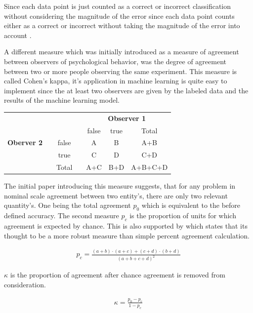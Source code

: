 \documentclass[
a4paper, 
12pt,
grayscalebody, %
abstract=on,
twoside, BCOR10mm, 12pt, DIV13,headinclude, footexclude, final, abstracton, openright
]{ibireprt}
\numberwithin{equation}{chapter}
\numberwithin{table}{chapter}
\numberwithin{figure}{chapter}
\numberwithin{algorithm}{chapter}
\numberwithin{example}{chapter}
\numberwithin{example}{chapter}
\begin{document}
Since each data point  is just counted as a correct or incorrect classification without considering the magnitude of the error since each data point counts either as a correct or incorrect without taking the magnitude of the error into account \cite{Dinga2019}.

A different measure which was initially introduced as a measure of agreement between observers of psychological behavior, was the degree of agreement between two or more people observing the same experiment. This measure is called Cohen's kappa, it's application in machine learning is quite easy to implement since the at least two observers are given by the labeled data and the results of the machine learning model.


\newcommand{\STAB}[1]{\begin{tabular}{@{}c@{}}#1\end{tabular}}
\begin{center}
	\begin{tabular}{ccccccc}
		\hline
		&&&&\multicolumn{3}{c}{\textbf{Observer 1}}\\
		&&&&false&true&Total\\
		\hline
		\textbf{Oberver 2}&&false& &A &B &A+B \\
		
		&&true&&C&D&C+D\\
				
		&&Total&&A+C&B+D&A+B+C+D\\
	\end{tabular}
\end{center}

The initial paper\cite{Cohen1960} introducing this measure suggests, that for any problem in nominal scale agreement between two entity's, there are only two relevant quantity's. One being the total agreement $p_0$ which is equivalent to the before defined accuracy. The second measure $p_c$ is the proportion of units for which agreement is expected by chance. This is also supported by \cite{Vieira2010} which states that its thought to be a more robust measure
than simple percent agreement calculation.

\begin{align}
	p_c =\frac{(a+b)\cdot(a+c)+(c+d)\cdot(b+d)}{(a+b+c+d)^2}
\end{align}

$\kappa$ is the proportion of agreement after chance agreement is removed from consideration. 

\begin{align}
	\kappa = \frac{p_0-p_c}{1-p_c}
\end{align}
\end{document}
